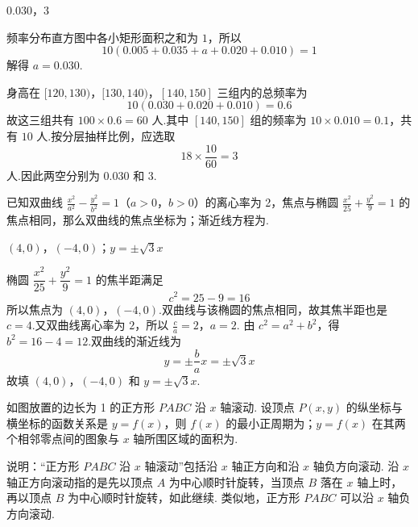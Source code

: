 \begin{answer}
\(0.030\)，\(3\)
\end{answer}

\begin{solution}
频率分布直方图中各小矩形面积之和为 \(1\)，所以
\[
10(0.005+0.035+a+0.020+0.010)=1
\]
解得 \(a=0.030\).

身高在 \([120,130)\)，\([130,140)\)，\([140,150]\) 三组内的总频率为
\[
10(0.030+0.020+0.010)=0.6
\]
故这三组共有 \(100\times0.6=60\) 人.其中 \([140,150]\) 组的频率为 \(10\times0.010=0.1\)，共有 \(10\) 人.按分层抽样比例，应选取
\[
18\times\frac{10}{60}=3
\]
人.因此两空分别为 \(0.030\) 和 \(3\).
\end{solution}

\begin{problem}
已知双曲线 \(\frac{x^2}{a^2} - \frac{y^2}{b^2} = 1\)（\(a > 0\)，\(b > 0\)）的离心率为 2，焦点与椭圆 \(\frac{x^2}{25} + \frac{y^2}{9} = 1\) 的焦点相同，那么双曲线的焦点坐标为\fillinblank{}；渐近线方程为\fillinblank{}.
\end{problem}

\begin{answer}
\((4,0)\)，\((-4,0)\)；\(y = \pm\sqrt{3}x\)
\end{answer}

\begin{solution}
椭圆 \(\dfrac{x^2}{25}+\dfrac{y^2}{9}=1\) 的焦半距满足
\[
c^2=25-9=16
\]
所以焦点为 \((4,0)\)，\((-4,0)\).双曲线与该椭圆的焦点相同，故其焦半距也是 \(c=4\).又双曲线离心率为 \(2\)，所以
\(\frac{c}{a}=2\)，\(a=2\).
由 \(c^2=a^2+b^2\)，得 \(b^2=16-4=12\).双曲线的渐近线为
\[
y=\pm\frac{b}{a}x=\pm\sqrt{3}x
\]
故填 \((4,0)\)，\((-4,0)\) 和 \(y=\pm\sqrt{3}x\).
\end{solution}

\begin{problem}
如图放置的边长为 1 的正方形 \(PABC\) 沿 \(x\) 轴滚动. 设顶点 \(P(x, y)\) 的纵坐标与横坐标的函数关系是 \(y = f(x)\)，则 \(f(x)\) 的最小正周期为\fillinblank{}；\(y = f(x)\) 在其两个相邻零点间的图象与 \(x\) 轴所围区域的面积为\fillinblank{}.

说明：“正方形 \(PABC\) 沿 \(x\) 轴滚动”包括沿 \(x\) 轴正方向和沿 \(x\) 轴负方向滚动. 沿 \(x\) 轴正方向滚动指的是先以顶点 \(A\) 为中心顺时针旋转，当顶点 \(B\) 落在 \(x\) 轴上时，再以顶点 \(B\) 为中心顺时针旋转，如此继续. 类似地，正方形 \(PABC\) 可以沿 \(x\) 轴负方向滚动.

\end{problem}

